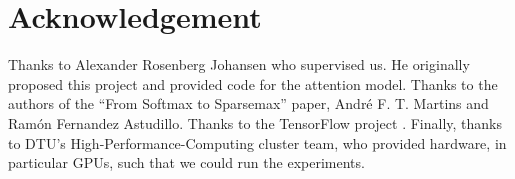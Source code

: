 \section{Acknowledgement}

Thanks to Alexander Rosenberg Johansen who supervised us. He originally proposed this project and provided code for the attention model. Thanks to the authors of the ``From Softmax to Sparsemax'' \cite{sparsemax} paper, André F. T. Martins and Ramón Fernandez Astudillo. Thanks to the TensorFlow project \cite{tensorflow2015-whitepaper}. Finally, thanks to DTU’s High-Performance-Computing cluster team, who provided hardware, in particular GPUs, such that we could run the experiments.